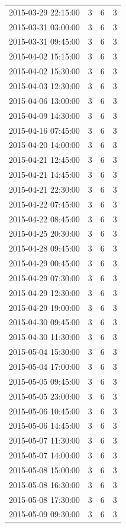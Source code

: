 \begin{tabular}{lrrr}
2015-03-29 22:15:00 & 3 & 6 & 3 \\
2015-03-31 03:00:00 & 3 & 6 & 3 \\
2015-03-31 09:45:00 & 3 & 6 & 3 \\
2015-04-02 15:15:00 & 3 & 6 & 3 \\
2015-04-02 15:30:00 & 3 & 6 & 3 \\
2015-04-03 12:30:00 & 3 & 6 & 3 \\
2015-04-06 13:00:00 & 3 & 6 & 3 \\
2015-04-09 14:30:00 & 3 & 6 & 3 \\
2015-04-16 07:45:00 & 3 & 6 & 3 \\
2015-04-20 14:00:00 & 3 & 6 & 3 \\
2015-04-21 12:45:00 & 3 & 6 & 3 \\
2015-04-21 14:45:00 & 3 & 6 & 3 \\
2015-04-21 22:30:00 & 3 & 6 & 3 \\
2015-04-22 07:45:00 & 3 & 6 & 3 \\
2015-04-22 08:45:00 & 3 & 6 & 3 \\
2015-04-25 20:30:00 & 3 & 6 & 3 \\
2015-04-28 09:45:00 & 3 & 6 & 3 \\
2015-04-29 00:45:00 & 3 & 6 & 3 \\
2015-04-29 07:30:00 & 3 & 6 & 3 \\
2015-04-29 12:30:00 & 3 & 6 & 3 \\
2015-04-29 19:00:00 & 3 & 6 & 3 \\
2015-04-30 09:45:00 & 3 & 6 & 3 \\
2015-04-30 11:30:00 & 3 & 6 & 3 \\
2015-05-04 15:30:00 & 3 & 6 & 3 \\
2015-05-04 17:00:00 & 3 & 6 & 3 \\
2015-05-05 09:45:00 & 3 & 6 & 3 \\
2015-05-05 23:00:00 & 3 & 6 & 3 \\
2015-05-06 10:45:00 & 3 & 6 & 3 \\
2015-05-06 14:45:00 & 3 & 6 & 3 \\
2015-05-07 11:30:00 & 3 & 6 & 3 \\
2015-05-07 14:00:00 & 3 & 6 & 3 \\
2015-05-08 15:00:00 & 3 & 6 & 3 \\
2015-05-08 16:30:00 & 3 & 6 & 3 \\
2015-05-08 17:30:00 & 3 & 6 & 3 \\
2015-05-09 09:30:00 & 3 & 6 & 3 \\

\end{tabular}
